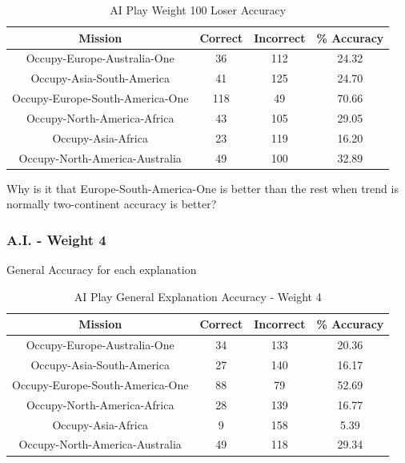 \documentclass[parskip]{cs4rep}
\begin{document}
\begin{table}[ht]
\centering
\begin{tabular}{|c|c|c|c|}
\hline 
\textbf{Mission} & \textbf{Correct} & \textbf{Incorrect} & \textbf{\% Accuracy} \\ 
\hline 
Occupy-Europe-Australia-One & 36 & 112 & 24.32 \\  
\hline 
Occupy-Asia-South-America & 41 & 125 & 24.70 \\ 
\hline
Occupy-Europe-South-America-One & 118 & 49 & 70.66 \\
\hline
Occupy-North-America-Africa & 43 & 105 & 29.05 \\
\hline
Occupy-Asia-Africa & 23 & 119 & 16.20 \\
\hline
Occupy-North-America-Australia & 49 & 100 & 32.89 \\
\hline
\end{tabular}
\caption{AI Play Weight 100 Loser Accuracy}
\label{table:ai-100-loser-accuracy}
\end{table}			

Why is it that Europe-South-America-One is better than the rest when trend is normally two-continent accuracy is better?

\newpage

\subsubsection{A.I. - Weight 4}

General Accuracy for each explanation

\begin{table}[ht]
\centering
\begin{tabular}{|c|c|c|c|}
\hline 
\textbf{Mission} & \textbf{Correct} & \textbf{Incorrect} & \textbf{\% Accuracy} \\ 
\hline 
Occupy-Europe-Australia-One & 34 & 133 & 20.36 \\  
\hline 
Occupy-Asia-South-America & 27 & 140 & 16.17 \\ 
\hline
Occupy-Europe-South-America-One & 88 & 79 & 52.69 \\
\hline
Occupy-North-America-Africa & 28 & 139 & 16.77 \\
\hline
Occupy-Asia-Africa & 9 & 158 & 5.39 \\
\hline
Occupy-North-America-Australia & 49 & 118 & 29.34 \\
\hline
\end{tabular}
\caption{AI Play General Explanation Accuracy - Weight 4}
\label{table:ai-4-general-accuracy}
\end{table}
\end{document}
